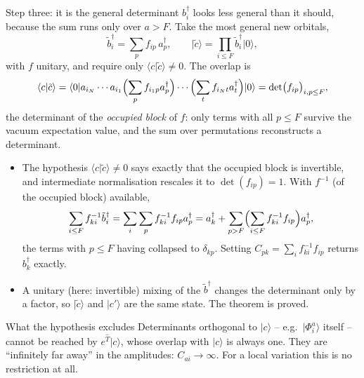 \documentclass[aspectratio=169,10pt]{beamer}
\newcommand{\ket}[1]{\vert #1\rangle}
\newcommand{\bra}[1]{\langle #1\vert}
\newcommand{\braket}[2]{\langle #1\vert #2\rangle}
\begin{document}
\begin{frame}[shrink=2]{Step three: it is the general determinant}
  \scriptsize
  $b_i^{\dagger}$ looks less general than it should, because the sum runs only over $a>F$. Take the most general new orbitals,
  \[
    \tilde{b}_i^{\dagger}=\sum_pf_{ip}\,a_p^{\dagger},\qquad\ket{\tilde{c}}=\prod_{i\le F}\tilde{b}_i^{\dagger}\ket{0},
  \]
  with $f$ unitary, and require only $\braket{c}{\tilde{c}}\ne0$. The overlap is
  \[
    \braket{c}{\tilde{c}}=\bra{0}a_{i_N}\cdots a_{i_1}\Bigl(\sum_pf_{i_1p}a_p^{\dagger}\Bigr)\cdots\Bigl(\sum_tf_{i_Nt}a_t^{\dagger}\Bigr)\ket{0}=\det\bigl(f_{ip}\bigr)_{i,p\le F},
  \]
  the determinant of the \emph{occupied block} of $f$: only terms with all $p\le F$ survive the vacuum expectation value, and the sum over permutations reconstructs a determinant.
  \begin{itemize}
    \item The hypothesis $\braket{c}{\tilde{c}}\ne0$ says exactly that the occupied block is invertible, and intermediate normalisation rescales it to $\det(f_{ip})=1$. With $f^{-1}$ (of the occupied block) available,
    \[
      \sum_{i\le F}f^{-1}_{ki}\tilde{b}_i^{\dagger}=\sum_i\sum_pf^{-1}_{ki}f_{ip}a_p^{\dagger}
      =a_k^{\dagger}+\sum_{p>F}\Bigl(\sum_{i\le F}f^{-1}_{ki}f_{ip}\Bigr)a_p^{\dagger},
    \]
    the terms with $p\le F$ having collapsed to $\delta_{kp}$. Setting $C_{pk}=\sum_if^{-1}_{ki}f_{ip}$ returns $b_k^{\dagger}$ exactly.
    \item A unitary (here: invertible) mixing of the $\tilde{b}^{\dagger}$ changes the determinant only by a factor, so $\ket{\tilde{c}}$ and $\ket{c'}$ are the same state. \alert{The theorem is proved.}
  \end{itemize}
  \begin{block}{What the hypothesis excludes}\scriptsize
    Determinants orthogonal to $\ket{c}$ -- e.g.\ $\ket{\Phi_i^a}$ itself -- cannot be reached by $e^{\hat{T}}\ket{c}$, whose overlap with $\ket{c}$ is always one. They are ``infinitely far away'' in the amplitudes: $C_{ai}\to\infty$. For a local variation this is no restriction at all.
  \end{block}
\end{frame}
\end{document}
